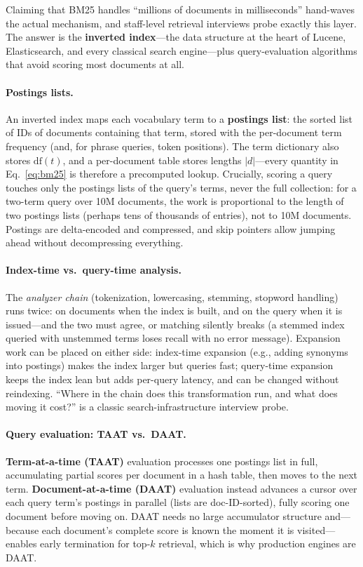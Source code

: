 Claiming that BM25 handles ``millions of documents in milliseconds'' hand-waves the
actual mechanism, and staff-level retrieval interviews probe exactly this layer. The
answer is the \textbf{inverted index}---the data structure at the heart of Lucene,
Elasticsearch, and every classical search engine---plus query-evaluation algorithms
that avoid scoring most documents at all.

\paragraph{Postings lists.}
An inverted index maps each vocabulary term to a \textbf{postings list}: the sorted
list of IDs of documents containing that term, stored with the per-document term
frequency (and, for phrase queries, token positions). The term dictionary also stores
$\text{df}(t)$, and a per-document table stores lengths $|d|$---every quantity in
Eq.~\eqref{eq:bm25} is therefore a precomputed lookup. Crucially, scoring a query
touches only the postings lists of the query's terms, never the full collection: for a
two-term query over 10M documents, the work is proportional to the length of two
postings lists (perhaps tens of thousands of entries), not to 10M documents. Postings
are delta-encoded and compressed, and skip pointers allow jumping ahead without
decompressing everything.

\paragraph{Index-time vs.\ query-time analysis.}
The \emph{analyzer chain} (tokenization, lowercasing, stemming, stopword handling) runs
twice: on documents when the index is built, and on the query when it is issued---and
the two must agree, or matching silently breaks (a stemmed index queried with unstemmed
terms loses recall with no error message). Expansion work can be placed on either side:
index-time expansion (e.g., adding synonyms into postings) makes the index larger but
queries fast; query-time expansion keeps the index lean but adds per-query latency, and
can be changed without reindexing. ``Where in the chain does this transformation run,
and what does moving it cost?'' is a classic search-infrastructure interview probe.

\paragraph{Query evaluation: TAAT vs.\ DAAT.}
\textbf{Term-at-a-time (TAAT)} evaluation processes one postings list in full,
accumulating partial scores per document in a hash table, then moves to the next term.
\textbf{Document-at-a-time (DAAT)} evaluation instead advances a cursor over each
query term's postings in parallel (lists are doc-ID-sorted), fully scoring one document
before moving on. DAAT needs no large accumulator structure and---because each
document's complete score is known the moment it is visited---enables early
termination for top-$k$ retrieval, which is why production engines are DAAT.

